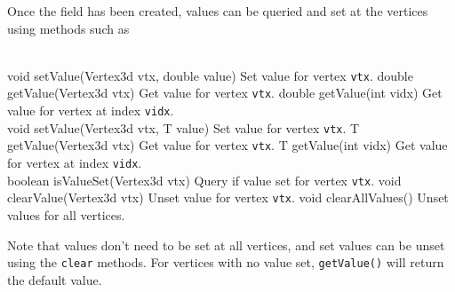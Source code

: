 Once the field has been created, values can be queried and set at the
vertices using methods such as

\begin{methodtable}{0.5}{0.5}
\midline
{}\\
\midline
%
%
{void setValue(Vertex3d vtx, double value)}%
{Set value for vertex {\tt vtx}.}%
%
%
{double getValue(Vertex3d vtx)}%
{Get value for vertex {\tt vtx}.}%
%
%
{double getValue(int vidx)}%
{Get value for vertex at index {\tt vidx}.}%
%
\midline
{}\\
\midline
%
%
{void setValue(Vertex3d vtx, T value)}%
{Set value for vertex {\tt vtx}.}%
%
%
{T getValue(Vertex3d vtx)}%
{Get value for vertex {\tt vtx}.}%
%
%
{T getValue(int vidx)}%
{Get value for vertex at index {\tt vidx}.}%
%
\midline
{}\\
\midline
{}%
{boolean isValueSet(Vertex3d vtx)}%
{Query if value set for vertex {\tt vtx}.}
%
%
{void clearValue(Vertex3d vtx)}%
{Unset value for vertex {\tt vtx}.}%
%
%
{void clearAllValues()}%
{Unset values for all vertices.}%
\midline
\end{methodtable}

%
%
%
Note that values don't need to be set at all vertices, and set values
can be unset using the {\tt clear} methods. For vertices with no value
set, {\tt getValue()} will return the default value.

